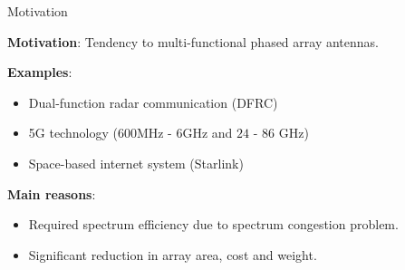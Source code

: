 \documentclass[../main.tex]{subfiles}
\begin{document}
%
%


\begin{frame}[t]{Motivation}

\textbf{Motivation}: Tendency to multi-functional phased array antennas.

\textbf{Examples}:

\begin{itemize}
    \item Dual-function radar communication (DFRC)
    \item 5G technology ($600$MHz - $6$GHz and $24$ - $86$ GHz)
    \item Space-based internet system (Starlink)
\end{itemize}

\textbf{Main reasons}: 
\begin{itemize}
    \item Required spectrum efficiency due to spectrum congestion problem.
    \item Significant reduction in array area, cost and weight.
\end{itemize}


\end{frame}



%
%
\end{document}
